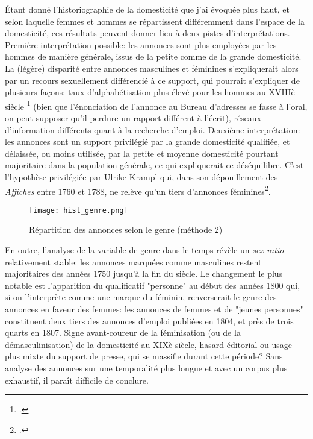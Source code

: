 Étant donné l'historiographie de la domesticité que j'ai évoquée plus haut, et selon laquelle femmes et hommes se répartissent différemment dans l'espace de la domesticité, ces résultats peuvent donner lieu à deux pistes d'interprétations. 
Première interprétation possible: les annonces sont plus employées par les hommes de manière générale, issus de la petite comme de la grande domesticité. La (légère) disparité entre annonces masculines et féminines s'expliquerait alors par un recours sexuellement différencié à ce support, qui pourrait s'expliquer de plusieurs façons: taux d'alphabétisation plus élevé pour les hommes au XVIIIè siècle \footcites{queniartEtapesResultatsProcessus1998} (bien que l'énonciation de l'annonce au Bureau d'adresses se fasse à l'oral, on peut supposer qu'il perdure un rapport différent à l'écrit), réseaux d'information différents quant à la recherche d'emploi. 
Deuxième interprétation: les annonces sont un support privilégié par la grande domesticité qualifiée, et délaissée, ou moins utilisée, par la petite et moyenne domesticité pourtant majoritaire dans la population générale, ce qui expliquerait ce déséquilibre. C'est l'hypothèse privilégiée par Ulrike Krampl qui, dans son dépouillement des\textit{ Affiches} entre 1760 et 1788, ne relève qu'un tiers d'annonces féminines\footcites{kramplPresseAnnoncesParisienne2020}.

\begin{figure}[h]
	\centering
	\texttt{[image: hist\_genre.png]}
	\caption{Répartition des annonces selon le genre (méthode 2)}
\end{figure}

En outre, l'analyse de la variable de genre dans le temps révèle un \textit{sex ratio} relativement stable: les annonces marquées comme masculines restent majoritaires des années 1750 jusqu'à la fin du siècle. Le changement le plus notable est l'apparition du qualificatif "personne" au début des années 1800 qui, si on l'interprète comme une marque du féminin, renverserait le genre des annonces en faveur des femmes: les annonces de femmes et de "jeunes personnes" constituent deux tiers des annonces d'emploi publiées en 1804, et près de trois quarts en 1807. Signe avant-coureur de la féminisation (ou de la démasculinisation) de la domesticité au XIXè siècle, hasard éditorial ou usage plus mixte du support de presse, qui se massifie durant cette période? Sans analyse des annonces sur une temporalité plus longue et avec un corpus plus exhaustif, il paraît difficile de conclure. 

